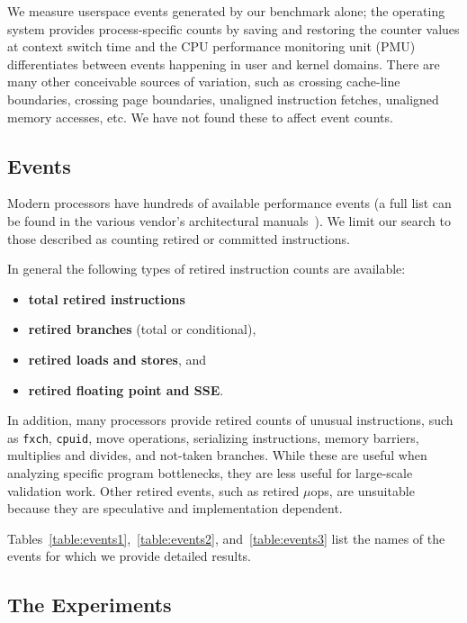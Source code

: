 We measure userspace events generated by our benchmark alone;
the operating system provides process-specific counts by saving
and restoring the counter values at context switch time
and the CPU performance monitoring unit (PMU) differentiates
between events happening in user and kernel domains.
There are many other conceivable sources of variation, such as
crossing cache-line boundaries, crossing page boundaries, 
unaligned instruction fetches, unaligned memory accesses, etc.
We have not found these to affect event counts.

%
%

\subsection{Events}

Modern processors have hundreds of available performance events
(a full list can be found in the various vendor's architectural 
manuals~\cite{intel:asdvol3,amd:fam10bkdg}).
We limit our search to those described as counting retired or
committed instructions.

In general the following types of retired 
instruction counts are available:
\begin{itemize}
\item {\bf total retired instructions}
\item {\bf retired branches} (total or conditional), %
\item {\bf retired loads and stores},
and
\item {\bf retired floating point and SSE}.
\end{itemize}

In addition, many processors provide retired counts
of unusual instructions, such as {\tt fxch},
{\tt cpuid}, move operations, serializing instructions,
memory barriers, multiplies and divides, and not-taken branches.  
While these
are useful when analyzing specific program bottlenecks, they
are less useful for large-scale validation work.
Other retired events, such as retired $\mu$ops,
are unsuitable because they are speculative and 
implementation dependent.

Tables~\ref{table:events1},~\ref{table:events2}, and~\ref{table:events3}
list the names of the events for which
we provide detailed results.

\subsection{The Experiments}

